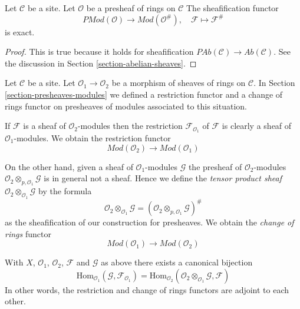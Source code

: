 \begin{lemma}
\label{lemma-sheafification-exact}
Let $\mathcal{C}$ be a site.
Let $\mathcal{O}$ be a presheaf of rings on $\mathcal{C}$
The sheafification functor
$$
\textit{PMod}(\mathcal{O}) \longrightarrow \textit{Mod}(\mathcal{O}^\#), \quad
\mathcal{F} \longmapsto \mathcal{F}^\#
$$
is exact.
\end{lemma}

\begin{proof}
This is true because it holds for sheafification
$\textit{PAb}(\mathcal{C}) \to \textit{Ab}(\mathcal{C})$.
See the discussion in Section \ref{section-abelian-sheaves}.
\end{proof}

\noindent
Let $\mathcal{C}$ be a site.
Let $\mathcal{O}_1 \to \mathcal{O}_2$ be
a morphism of sheaves of rings on $\mathcal{C}$.
In Section \ref{section-presheaves-modules}
we defined a restriction functor
and a change of rings functor on presheaves of modules
associated to this situation.

\medskip\noindent
If $\mathcal{F}$ is a sheaf of $\mathcal{O}_2$-modules
then the restriction $\mathcal{F}_{\mathcal{O}_1}$
of $\mathcal{F}$ is clearly a sheaf
of $\mathcal{O}_1$-modules. We obtain the restriction functor
$$
\textit{Mod}(\mathcal{O}_2)
\longrightarrow
\textit{Mod}(\mathcal{O}_1)
$$

\medskip\noindent
On the other hand, given a sheaf of $\mathcal{O}_1$-modules
$\mathcal{G}$ the presheaf of $\mathcal{O}_2$-modules
$\mathcal{O}_2 \otimes_{p, \mathcal{O}_1} \mathcal{G}$
is in general not a sheaf. Hence we define the
{\it tensor product sheaf}
$\mathcal{O}_2 \otimes_{\mathcal{O}_1} \mathcal{G}$
by the formula
$$
\mathcal{O}_2 \otimes_{\mathcal{O}_1} \mathcal{G}
=
(\mathcal{O}_2 \otimes_{p, \mathcal{O}_1} \mathcal{G})^\#
$$
as the sheafification of our construction for presheaves.
We obtain the {\it change of rings} functor
$$
\textit{Mod}(\mathcal{O}_1)
\longrightarrow
\textit{Mod}(\mathcal{O}_2)
$$

\begin{lemma}
\label{lemma-adjointness-tensor-restrict}
With $X$, $\mathcal{O}_1$, $\mathcal{O}_2$, $\mathcal{F}$ and
$\mathcal{G}$ as above there exists a canonical bijection
$$
\text{Hom}_{\mathcal{O}_1}(\mathcal{G}, \mathcal{F}_{\mathcal{O}_1})
=
\text{Hom}_{\mathcal{O}_2}(
\mathcal{O}_2 \otimes_{\mathcal{O}_1} \mathcal{G},
\mathcal{F}
)
$$
In other words, the restriction and change of rings functors
are adjoint to each other.
\end{lemma}

